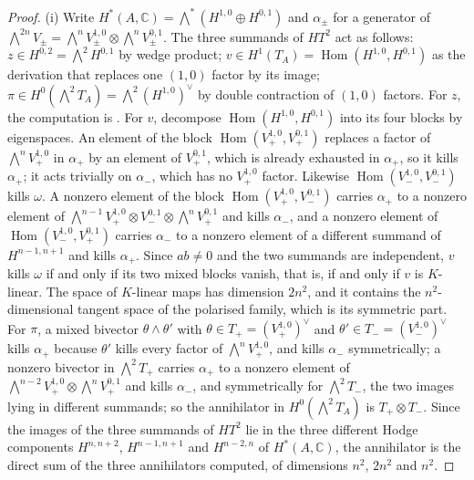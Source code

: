 \documentclass[11pt,reqno]{amsart}
\theoremstyle{plain}
\theoremstyle{definition}
\theoremstyle{remark}
\newcommand{\CC}{\mathbb{C}}
\DeclareMathOperator{\Hom}{Hom}
\begin{document}
\begin{proof}
(i) Write $H^{*}(A,\CC)=\bigwedge^{*}(H^{1,0}\oplus H^{0,1})$ and
$\alpha_{\pm}$ for a generator of $\bigwedge^{2n}V_{\pm}
=\bigwedge^{n}V_{\pm}^{1,0}\otimes\bigwedge^{n}V_{\pm}^{0,1}$. The three
summands of $HT^{2}$ act as follows: $z\in H^{0,2}=\bigwedge^{2}H^{0,1}$ by
wedge product; $v\in H^{1}(T_{A})=\Hom(H^{1,0},H^{0,1})$ as the derivation
that replaces one $(1,0)$ factor by its image; $\pi\in H^{0}(\bigwedge^{2}T_{A})
=\bigwedge^{2}(H^{1,0})^{\vee}$ by double contraction of $(1,0)$ factors. For
$z$, the computation is \cite[Lemma~9.6]{paperI}. For $v$, decompose
$\Hom(H^{1,0},H^{0,1})$ into its four blocks by eigenspaces. An element of
the block $\Hom(V_{+}^{1,0},V_{+}^{0,1})$ replaces a factor of
$\bigwedge^{n}V_{+}^{1,0}$ in $\alpha_{+}$ by an element of $V_{+}^{0,1}$,
which is already exhausted in $\alpha_{+}$, so it kills $\alpha_{+}$; it acts
trivially on $\alpha_{-}$,
which has no $V_{+}^{1,0}$ factor. Likewise $\Hom(V_{-}^{1,0},V_{-}^{0,1})$
kills $\omega$. A nonzero element of the block $\Hom(V_{+}^{1,0},V_{-}^{0,1})$
carries $\alpha_{+}$ to a nonzero element of
$\bigwedge^{n-1}V_{+}^{1,0}\otimes V_{-}^{0,1}\otimes\bigwedge^{n}V_{+}^{0,1}$
and kills $\alpha_{-}$, and a nonzero element of $\Hom(V_{-}^{1,0},V_{+}^{0,1})$
carries $\alpha_{-}$ to a nonzero element of a different summand of
$H^{n-1,n+1}$ and kills $\alpha_{+}$. Since $ab\ne0$ and the two summands are
independent, $v$ kills $\omega$ if and only if its two mixed blocks vanish,
that is, if and only if $v$ is $K$-linear. The space of $K$-linear maps has
dimension $2n^{2}$, and it contains the $n^{2}$-dimensional tangent space of
the polarised family, which is its symmetric part. For $\pi$, a mixed
bivector $\theta\wedge\theta'$ with $\theta\in T_{+}=(V_{+}^{1,0})^{\vee}$ and
$\theta'\in T_{-}=(V_{-}^{1,0})^{\vee}$ kills $\alpha_{+}$ because $\theta'$
kills every factor of $\bigwedge^{n}V_{+}^{1,0}$, and kills $\alpha_{-}$
symmetrically; a nonzero bivector in $\bigwedge^{2}T_{+}$ carries $\alpha_{+}$
to a nonzero element of $\bigwedge^{n-2}V_{+}^{1,0}\otimes\bigwedge^{n}V_{+}^{0,1}$
and kills $\alpha_{-}$, and symmetrically for $\bigwedge^{2}T_{-}$, the two
images lying in different summands; so the annihilator in
$H^{0}(\bigwedge^{2}T_{A})$ is $T_{+}\otimes T_{-}$. Since the images of the
three summands of $HT^{2}$ lie in the three different Hodge components
$H^{n,n+2}$, $H^{n-1,n+1}$ and $H^{n-2,n}$ of $H^{*}(A,\CC)$, the annihilator
is the direct sum of the three annihilators computed, of dimensions $n^{2}$,
$2n^{2}$ and $n^{2}$.


\end{proof}
\end{document}
